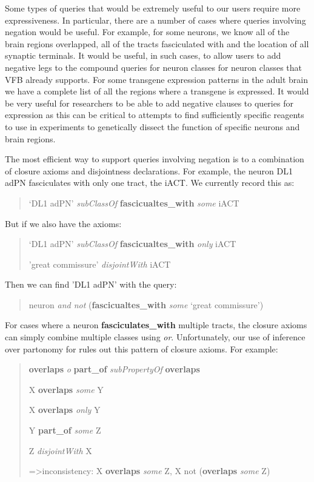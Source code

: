 \documentclass[runningheads,a4paper]{llncs}
\begin{document}
Some types of queries that would be extremely useful to our users
require more expressiveness.  In particular, there are a number of
cases where queries involving negation would be useful.  For example,
for some neurons, we know all of the brain regions overlapped, all of
the tracts fasciculated with and the location of all synaptic
terminals.  It would be useful, in such cases, to allow users to add
negative legs to the compound queries for neuron classes for neuron
classes that VFB already supports.  For some transgene expression
patterns in the adult brain we have a complete list of all the regions
where a transgene is expressed.  It would be very useful for
researchers to be able to add negative clauses to queries for
expression as this can be critical to attempts to find sufficiently
specific reagents to use in experiments to genetically dissect the
function of specific neurons and brain regions.

The most efficient way to support queries involving negation is to a
combination of closure axioms and disjointness declarations.  For
example, the neuron DL1 adPN fasciculates with only one tract, the
iACT.  We currently record this as:


\begin{quote} 
`DL1 adPN' \textit{subClassOf} \textbf{fascicualtes\_with} \textit{some} iACT
\end{quote}

But if we also have the axioms:

\begin{quote}
`DL1 adPN' \textit{subClassOf} \textbf{fascicualtes\_with}
\textit{only} iACT

'great commissure' \textit{disjointWith} iACT
\end{quote}

Then we can find 'DL1 adPN' with the query:
\begin{quote} 
	neuron \textit{and not} (\textbf{fascicualtes\_with} \textit{some} `great commissure')
\end{quote}

For cases where a neuron \textbf{fasciculates\_with} multiple tracts, the
closure axioms can simply combine multiple classes using
\textit{or}. Unfortunately, our use of inference over partonomy for rules out
this pattern of closure axioms.  For example:

\begin{quote}
\textbf{overlaps} \textit{o} \textbf{part\_of} \textit{subPropertyOf}
\textbf{overlaps}

X \textbf{overlaps} \textit{some} Y

X \textbf{overlaps} \textit{only} Y 

Y \textbf{part\_of} \textit{some} Z

Z \textit{disjointWith} X

=\textgreater inconsistency: X \textbf{overlaps} \textit{some} Z, X not (\textbf{overlaps} \textit{some} Z)
\end{quote}
\end{document}

